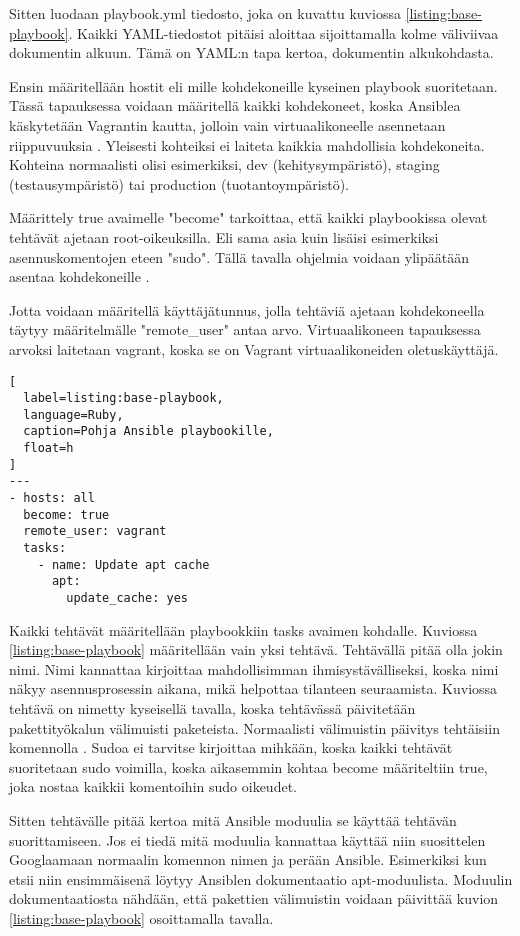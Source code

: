 Sitten luodaan playbook.yml tiedosto, joka on kuvattu kuviossa \ref{listing:base-playbook}. Kaikki YAML-tiedostot pitäisi aloittaa sijoittamalla kolme väliviivaa dokumentin alkuun. Tämä on YAML:n tapa kertoa, dokumentin alkukohdasta.

Ensin määritellään hostit eli mille kohdekoneille kyseinen playbook suoritetaan. Tässä tapauksessa voidaan määritellä kaikki kohdekoneet, koska Ansiblea käskytetään Vagrantin kautta, jolloin vain virtuaalikoneelle asennetaan riippuvuuksia \cite{link:comprehensive-ansible-tutorial}. Yleisesti kohteiksi ei laiteta kaikkia mahdollisia kohdekoneita. Kohteina normaalisti olisi esimerkiksi, dev (kehitysympäristö), staging (testausympäristö) tai production (tuotantoympäristö).

Määrittely true avaimelle "become" tarkoittaa, että kaikki playbookissa olevat tehtävät ajetaan root-oikeuksilla. Eli sama asia kuin lisäisi esimerkiksi asennuskomentojen eteen "sudo". Tällä tavalla ohjelmia voidaan ylipäätään asentaa kohdekoneille \cite{link:ansible-configuration-file}.

Jotta voidaan määritellä käyttäjätunnus, jolla tehtäviä ajetaan kohdekoneella täytyy määritelmälle "remote\_user" antaa arvo. Virtuaalikoneen tapauksessa arvoksi laitetaan vagrant, koska se on Vagrant virtuaalikoneiden oletuskäyttäjä.

\begin{lstlisting}[
  label=listing:base-playbook,
  language=Ruby,
  caption=Pohja Ansible playbookille,
  float=h
]
---
- hosts: all
  become: true
  remote_user: vagrant
  tasks:
    - name: Update apt cache
      apt:
        update_cache: yes
\end{lstlisting}

Kaikki tehtävät määritellään playbookkiin tasks avaimen kohdalle. Kuviossa \ref{listing:base-playbook} määritellään vain yksi tehtävä. Tehtävällä pitää olla jokin nimi. Nimi kannattaa kirjoittaa mahdollisimman ihmisystävälliseksi, koska nimi näkyy asennusprosessin aikana, mikä helpottaa tilanteen seuraamista. Kuviossa tehtävä on nimetty kyseisellä tavalla, koska tehtävässä päivitetään pakettityökalun välimuisti paketeista. Normaalisti välimuistin päivitys tehtäisiin komennolla . Sudoa ei tarvitse kirjoittaa mihkään, koska kaikki tehtävät suoritetaan sudo voimilla, koska aikasemmin kohtaa become määriteltiin true, joka nostaa kaikkii komentoihin sudo oikeudet.

Sitten tehtävälle pitää kertoa mitä Ansible moduulia se käyttää tehtävän suorittamiseen. Jos ei tiedä mitä moduulia kannattaa käyttää niin suosittelen Googlaamaan normaalin komennon nimen ja perään Ansible. Esimerkiksi kun etsii  niin ensimmäisenä löytyy Ansiblen dokumentaatio apt-moduulista. Moduulin dokumentaatiosta nähdään, että pakettien välimuistin voidaan päivittää kuvion \ref{listing:base-playbook} osoittamalla tavalla.

